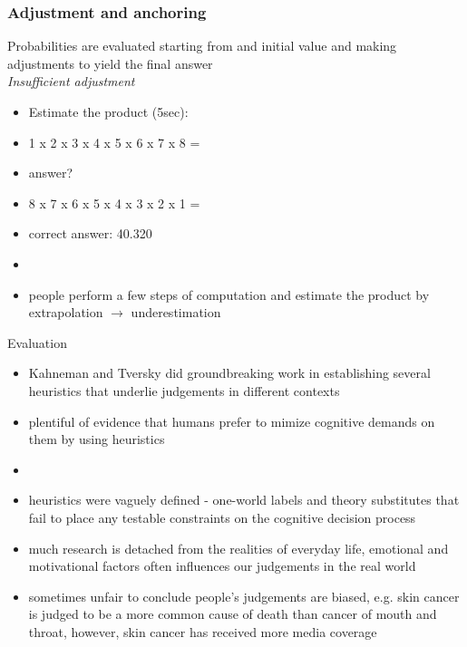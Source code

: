 \documentclass[]{beamer}
\begin{document}
\begin{frame}
 \frametitle{Adjustment and anchoring}
\begin{overlayarea}{120mm}{70mm}
 Probabilities are evaluated starting from and initial value and making adjustments to yield the final answer\\ \vspace{3mm}
\textit{Insufficient adjustment} 
\begin{itemize}
 \item Estimate the product (5sec): 
 \item<2,6-> 1 x 2 x 3 x 4 x 5 x 6 x 7 x 8 = 
 \item<3,5> answer? 
 \item<4,6-> 8 x 7 x 6 x 5 x 4 x 3 x 2 x 1 = 
 \item<7-> correct answer: 40.320
 \item[]
 \item<8-> people perform a few steps of computation and estimate the product by extrapolation $\rightarrow$ underestimation
\end{itemize}
\end{overlayarea}
\end{frame}

\begin{frame}{Evaluation}
 \begin{overlayarea}{120mm}{80mm}
  
\begin{itemize}
 \item Kahneman and Tversky did groundbreaking work in establishing several heuristics that underlie judgements in different contexts
 \item plentiful of evidence that humans prefer to mimize cognitive demands on them by using heuristics
 \item[]
 \item<2->[!] heuristics were vaguely defined - one-world labels and theory substitutes that fail to place any testable constraints on the cognitive decision process
 \item<3->[!] much research is detached from the realities of everyday life, emotional and motivational factors often influences our judgements in the real world
 \item<4->[!] sometimes unfair to conclude people's judgements are biased, e.g. skin cancer is judged to be a more common cause of death than cancer of mouth and throat, however, skin cancer has received more media coverage 
 \end{itemize}
\end{overlayarea}
\end{frame}
\end{document}
